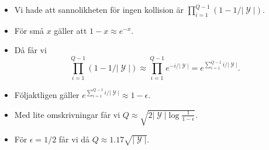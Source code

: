 \documentclass{beamer}
\theoremstyle{definition}
\DeclareMathOperator{\X}{\mathcal{X}}
\DeclareMathOperator{\Y}{\mathcal{Y}}
\begin{document}

\begin{frame}{\insertsubsectionhead}
  \begin{itemize}
    \item Vi hade att sannolikheten för ingen kollision är 
      \(\prod_{i=1}^{Q-1}(1 - 1/|\Y|)\).

    \item För små \(x\) gäller att \(1 - x\approx e^{-x}\).

    \item Då får vi \[\prod_{i=1}^{Q-1}(1-1/|\Y|)\approx \prod_{i=1}^{Q-1} 
      e^{-i/|\Y|} = e^{\sum_{i=1}^{Q-1} i/|\Y|}.\]

    \item Följaktligen gäller \(e^{\sum_{i=1}^{Q-1} i/|\Y|}\approx 
      1-\epsilon\).

    \item Med lite omskrivningar får vi \(Q\approx 
      \sqrt{2|\Y|\log\frac{1}{1-\epsilon}}\).

    \item För \(\epsilon = 1/2\) får vi då \(Q\approx 1.17\sqrt{|\Y|}\).

  \end{itemize}
\end{frame}
\end{document}
